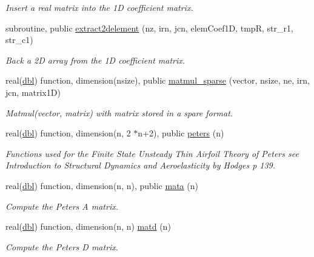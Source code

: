 \begin{DoxyCompactItemize}
\begin{DoxyCompactList}\small\item\em Insert a real matrix into the 1D coefficient matrix. \end{DoxyCompactList}\item 
subroutine, public \hyperlink{namespaceglobaldatafun_a8068755a2ac0857cf1dfc681e43af3a8}{extract2delement} (nz, irn, jcn, elem\+Coef1D, tmpR, str\+\_\+r1, str\+\_\+c1)
\begin{DoxyCompactList}\small\item\em Back a 2D array from the 1D coefficient matrix. \end{DoxyCompactList}\item 
real(\hyperlink{namespaceglobaldatafun_a5008801201dd34f2af8eae07756befb4}{dbl}) function, dimension(nsize), public \hyperlink{namespaceglobaldatafun_a370a248c97771d5e9b8410dedbfb548c}{matmul\+\_\+sparse} (vector, nsize, ne, irn, jcn, matrix1D)
\begin{DoxyCompactList}\small\item\em Matmul(vector, matrix) with matrix stored in a spare format. \end{DoxyCompactList}\item 
real(\hyperlink{namespaceglobaldatafun_a5008801201dd34f2af8eae07756befb4}{dbl}) function, dimension(n, 2 $\ast$n+2), public \hyperlink{namespaceglobaldatafun_a9bdeebcd65cb298adc440430560beddc}{peters} (n)
\begin{DoxyCompactList}\small\item\em Functions used for the Finite State Unsteady Thin Airfoil Theory of Peters see Introduction to Structural Dynamics and Aeroelasticity by Hodges p 139. \end{DoxyCompactList}\item 
real(\hyperlink{namespaceglobaldatafun_a5008801201dd34f2af8eae07756befb4}{dbl}) function, dimension(n, n), public \hyperlink{namespaceglobaldatafun_abc2a555e679f86fd986da760d49b71bc}{mata} (n)
\begin{DoxyCompactList}\small\item\em Compute the Peters A matrix. \end{DoxyCompactList}\item 
real(\hyperlink{namespaceglobaldatafun_a5008801201dd34f2af8eae07756befb4}{dbl}) function, dimension(n, n) \hyperlink{namespaceglobaldatafun_a5290afbf1d3da671a523a4727bdc7218}{matd} (n)
\begin{DoxyCompactList}\small\item\em Compute the Peters D matrix. \end{DoxyCompactList}\item 

\end{DoxyCompactItemize}
